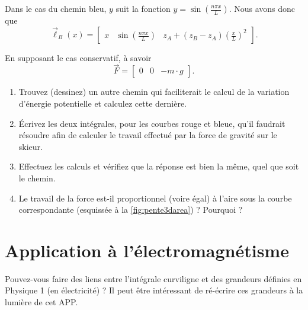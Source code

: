 \documentclass[10pt,oneside]{article}
\begin{document}
Dans le cas du chemin bleu, $y$ suit la fonction $y=\sin\left(\frac{n\pi x}{L}\right)$. Nous avons donc que
\begin{equation}
    \vec{\ell}_B(x) = \begin{bmatrix}x & \sin\left(\frac{n\pi x}{L}\right) & z_A + (z_B - z_A)\left(\frac{x}{L}\right)^2 \end{bmatrix}.
\end{equation}
\fi

En supposant le cas conservatif, à savoir
\begin{equation}
\vec{F} = \begin{bmatrix} 0 & 0 &-m\cdot g\end{bmatrix}.
\end{equation}

\begin{enumerate}
    \item Trouvez (dessinez) un autre chemin qui faciliterait le calcul de la variation d'énergie potentielle et calculez cette dernière.
    \item Écrivez les deux intégrales, pour les courbes rouge et bleue, qu'il faudrait résoudre afin de calculer le travail effectué par la force de gravité sur le skieur.
    \item Effectuez les calculs et vérifiez que la réponse est bien la même, quel que soit le chemin.
    \item Le travail de la force est-il proportionnel (voire égal) à l'aire sous la courbe correspondante (esquissée à la \autoref{fig:pente3darea}) ? Pourquoi ? 
\end{enumerate}

\section{Application à l'électromagnétisme}

Pouvez-vous faire des liens entre l'intégrale curviligne et des grandeurs définies en Physique 1 (en électricité) ? Il peut être intéressant de ré-écrire ces grandeurs à la lumière de cet APP. 
\end{document}

